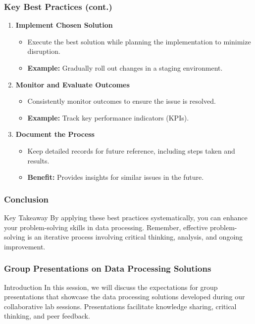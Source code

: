 \documentclass[aspectratio=169]{beamer}
\begin{document}
\begin{frame}[fragile]
    \frametitle{Key Best Practices (cont.)}
    \begin{enumerate}[resume]
        \item \textbf{Implement Chosen Solution}
            \begin{itemize}
                \item Execute the best solution while planning the implementation to minimize disruption.
                \item \textbf{Example:} Gradually roll out changes in a staging environment.
            \end{itemize}
        
        \item \textbf{Monitor and Evaluate Outcomes}
            \begin{itemize}
                \item Consistently monitor outcomes to ensure the issue is resolved.
                \item \textbf{Example:} Track key performance indicators (KPIs).
            \end{itemize}
        
        \item \textbf{Document the Process}
            \begin{itemize}
                \item Keep detailed records for future reference, including steps taken and results.
                \item \textbf{Benefit:} Provides insights for similar issues in the future.
            \end{itemize}
    \end{enumerate}
\end{frame}

\begin{frame}[fragile]
    \frametitle{Conclusion}
    \begin{block}{Key Takeaway}
        By applying these best practices systematically, you can enhance your problem-solving skills in data processing. 
        Remember, effective problem-solving is an iterative process involving critical thinking, analysis, and ongoing improvement.
    \end{block}
\end{frame}

\begin{frame}[fragile]
    \frametitle{Group Presentations on Data Processing Solutions}
    \begin{block}{Introduction}
        In this session, we will discuss the expectations for group presentations that showcase the data processing solutions developed during our collaborative lab sessions. Presentations facilitate knowledge sharing, critical thinking, and peer feedback.
    \end{block}
\end{frame}
\end{document}
